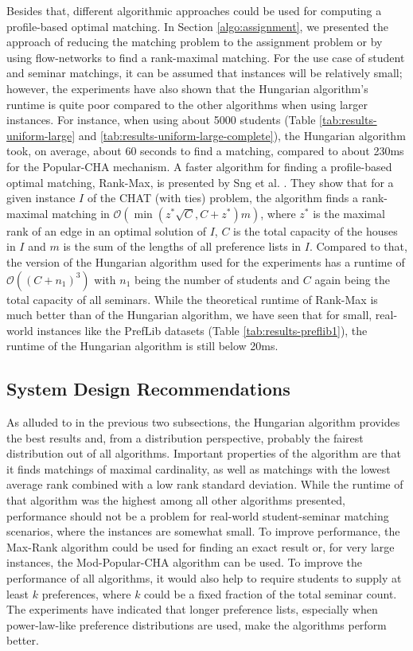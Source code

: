 Besides that, different algorithmic approaches could be used for computing a profile-based optimal matching. In Section \ref{algo:assignment}, we presented the approach of reducing the matching problem to the assignment problem or by using flow-networks to find a rank-maximal matching. For the use case of student and seminar matchings, it can be assumed that instances will be relatively small; however, the experiments have also shown that the Hungarian algorithm's runtime is quite poor compared to the other algorithms when using larger instances. For instance, when using about 5000 students (Table \ref{tab:results-uniform-large} and \ref{tab:results-uniform-large-complete}),
the Hungarian algorithm took, on average, about 60 seconds to find a matching, compared to about 230ms for the Popular-CHA mechanism. A faster algorithm for finding a profile-based optimal matching, Rank-Max, is presented by Sng et al. \cite{SngThesis}. They show that for a given instance $I$ of the CHAT (with ties) problem, the algorithm finds a rank-maximal matching in $\mathcal{O}(\min(z^*\sqrt{C}, C + z^*)m)$, where $z^*$ is the maximal rank of an edge in an optimal solution of $I$, $C$ is the total capacity of the houses in $I$ and $m$ is the sum of the lengths of all preference lists in $I$. Compared to that, the version of the Hungarian algorithm used for the experiments has a runtime of $\mathcal{O}((C+n_1)^3)$ with $n_1$ being the number of students and $C$ again being the total capacity of all seminars. While the theoretical runtime of Rank-Max is much better than of the Hungarian algorithm, we have seen that for small, real-world instances like the PrefLib datasets (Table \ref{tab:results-preflib1}), the runtime of the Hungarian algorithm is still below 20ms.

\subsection{System Design Recommendations}
As alluded to in the previous two subsections, the Hungarian algorithm provides the best results and, from a distribution perspective, probably the fairest distribution out of all algorithms. Important properties of the algorithm are that it finds matchings of maximal cardinality, as well as matchings with the lowest average rank combined with a low rank standard deviation. While the runtime of that algorithm was the highest among all other algorithms presented, performance should not be a problem for real-world student-seminar matching scenarios, where the instances are somewhat small. To improve performance, the Max-Rank algorithm \cite{SngThesis} could be used for finding an exact result or, for very large instances, the Mod-Popular-CHA algorithm can be used. To improve the performance of all algorithms, it would also help to require students to supply at least $k$ preferences, where $k$ could be a fixed fraction of the total seminar count. The experiments have indicated that longer preference lists, especially when power-law-like preference distributions are used, make the algorithms perform better.


